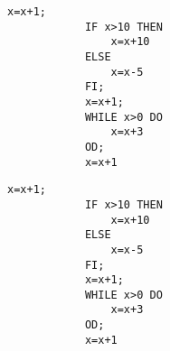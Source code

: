 

\newenvironment{code}[1]{}{}



		\begin{lstlisting}[caption={Hello world}]
			x=x+1;
			IF x>10 THEN
				x=x+10
			ELSE
				x=x-5
			FI;
			x=x+1;
			WHILE x>0 DO
				x=x+3
			OD;
			x=x+1
		\end{lstlisting}

		\begin{lstlisting}[caption={Hello world}]
			x=x+1;
			IF x>10 THEN
				x=x+10
			ELSE
				x=x-5
			FI;
			x=x+1;
			WHILE x>0 DO
				x=x+3
			OD;
			x=x+1
		\end{lstlisting}
